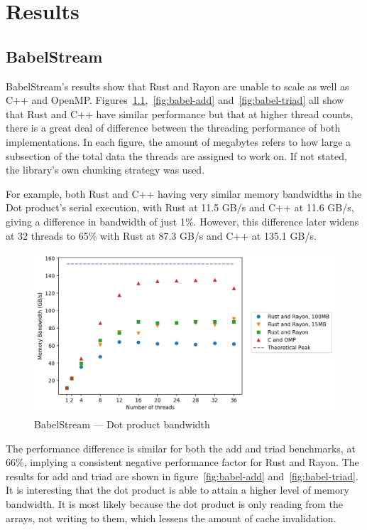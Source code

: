 \chapter{Results}
\section{BabelStream}\label{sec:res-babel}
BabelStream's results show that Rust and Rayon are unable to scale as well as C++ and OpenMP\@. Figures~\ref{fig:babel-dot},~\ref{fig:babel-add} and~\ref{fig:babel-triad} all show that Rust and C++ have similar performance but that at higher thread counts, there is a great deal of difference between the threading performance of both implementations. In each figure, the amount of megabytes refers to how large a subsection of the total data the threads are assigned to work on. If not stated, the library's own chunking strategy was used.

For example, both Rust and C++ having very similar memory bandwidths in the Dot product's serial execution, with Rust at 11.5 GB/s and C++ at 11.6 GB/s, giving a difference in bandwidth of just 1\%.
However, this difference later widens at 32 threads to 65\% with Rust at 87.3 GB/s and C++ at 135.1 GB/s.

\begin{figure}[h]
\centering
\includegraphics[width=.9\linewidth]{figs/babel/Dot.png}
\caption{BabelStream --- Dot product bandwidth}\label{fig:babel-dot}
\end{figure}

The performance difference is similar for both the add and triad benchmarks, at 66\%, implying a consistent negative performance factor for Rust and Rayon. The results for add and triad are shown in figure~\ref{fig:babel-add} and~\ref{fig:babel-triad}.
It is interesting that the dot product is able to attain a higher level of memory bandwidth. It is most likely because the dot product is only reading from the arrays, not writing to them, which lessens the amount of cache invalidation.

